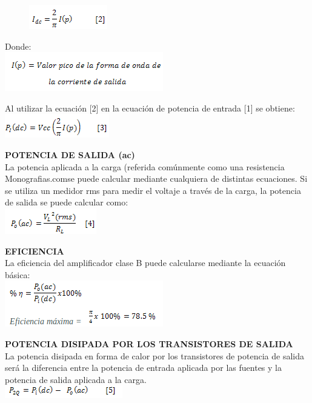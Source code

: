 \documentclass[10pt,a4paper]{article}
\begin{document}
\begin{center}
\begin{figure}[hbtp]
\centering
\includegraphics[scale=0.5]{13.png}
\end{figure}
\end{center}

Donde:\\
\includegraphics[scale=0.5]{14.png} 

Al utilizar la ecuación [2] en la ecuación de potencia de entrada [1] se obtiene:\\
\includegraphics[scale=0.5]{15.png} 

\textbf{POTENCIA DE SALIDA (ac)}\\
La potencia aplicada a la carga (referida comúnmente como una resistencia Monografias.comse puede calcular mediante cualquiera de distintas ecuaciones. Si se utiliza un medidor rms para medir el voltaje a través de la carga, la potencia de salida se puede calcular como:\\
\includegraphics[scale=0.5]{16.png} 

\textbf{EFICIENCIA}\\
La eficiencia del amplificador clase B puede calcularse mediante la ecuación básica:\\
\includegraphics[scale=0.5]{17.png}

\textbf{ POTENCIA DISIPADA POR LOS TRANSISTORES DE SALIDA}\\
La potencia disipada en forma de calor por los transistores de potencia de salida será la diferencia entre la potencia de entrada aplicada por las fuentes y la potencia de salida aplicada a la carga.\\
\includegraphics[scale=0.5]{18.png}
\end{document}
